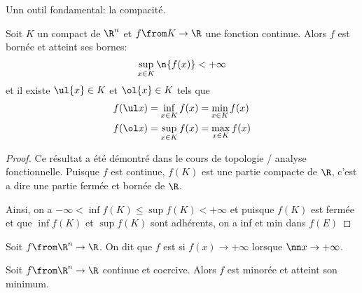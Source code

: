 Unn outil fondamental: la compacité.

\begin{theorem}
    Soit \(K\) un compact de \(\R^n\) et \(f\from K\to\R\)
    une fonction continue. Alors \(f\) est bornée et atteint ses
    bornes:
    \begin{equation*}
        \sup_{x\in K} \n{f(x)} < +\infty
    \end{equation*}
    et il existe \(\ul{x}\in K\) et \(\ol{x} \in K\) tels que
    \begin{equation*}
        \begin{aligned}
            &f(\ul x) = \inf_{x\in K} f(x) = \min_{x\in K} f(x)\\
            &f(\ol x) = \sup_{x\in K} f(x) = \max_{x\in K} f(x)
        \end{aligned}
    \end{equation*}
\end{theorem}

\begin{proof}
    Ce résultat a été démontré dans le cours de topologie / analyse
    fonctionnelle. Puisque \(f\) est continue, \(f(K)\) est une partie compacte de \(\R\),
    c'est a dire une partie fermée et bornée de \(\R\).

    Ainsi, on a \(-\infty < \inf f(K) \leq \sup f(K) < +\infty\)
    et puisque \(f(K)\) est fermée et que \(\inf f(K)\) et \(\sup f(K)\)
    sont adhérents, on a inf et min dans \(f(E)\) %
\end{proof}

\begin{definition}
    Soit \(f\from \R^n\to\R\). On dit que \(f\) est 
    si \(f(x) \to +\infty\) lorsque \(\nn x\to +\infty\).
\end{definition}

\begin{theorem}
    Soit \(f\from \R^n\to\R\) continue et coercive. Alors \(f\) est minorée
    et atteint son minimum.
\end{theorem}

